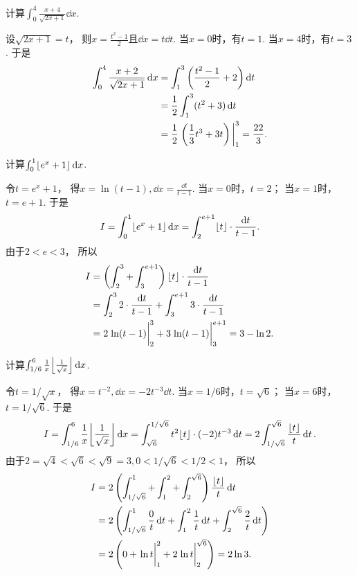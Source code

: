 \begin{example}
计算\(\int_0^4 \frac{x+4}{\sqrt{2x+1}} \dd{x}\).
\begin{solution}
设\(\sqrt{2x+1}=t\)，
则\(x=\frac{t^2-1}2\)且\(\dd{x}=t\dd{t}\).
当\(x=0\)时，有\(t=1\).
当\(x=4\)时，有\(t=3\).
于是\begin{align*}
	\int_0^4 \frac{x+2}{\sqrt{2x+1}} \dd{x}
	&= \int_1^3 \left(\frac{t^2-1}2+2\right) \dd{t} \\
	&= \frac12 \int_1^3 (t^2+3) \dd{t} \\
	&= \frac12 \eval{\left(\frac13 t^3 + 3t\right)}_1^3
	= \frac{22}3.
\end{align*}
\end{solution}
\end{example}

\begin{example}
计算\(\int_0^1 \lfloor e^x+1\rfloor \dd{x}\).
\begin{solution}
令\(t = e^x+1\)，
得\(x = \ln(t-1),
\dd{x} = \frac{\dd{t}}{t-1}\).
当\(x=0\)时，\(t=2\)；
当\(x=1\)时，\(t=e+1\).
于是\[
	I = \int_0^1 \lfloor e^x+1\rfloor \dd{x}
	= \int_2^{e+1} \lfloor t\rfloor \cdot \frac{\dd{t}}{t-1}.
\]
由于\(2<e<3\)，
所以\begin{align*}
	I &= \left( \int_2^3 + \int_3^{e+1} \right) \floor{t} \cdot \frac{\dd{t}}{t-1} \\
	&= \int_2^3 2 \cdot \frac{\dd{t}}{t-1}
	+ \int_3^{e+1} 3 \cdot \frac{\dd{t}}{t-1} \\
	&= 2 \eval{\ln(t-1)}_2^3 + 3 \eval{\ln(t-1)}_3^{e+1}
	= 3 - \ln2.
\end{align*}
\end{solution}
\end{example}
\begin{example}
计算\(\int_{1/6}^6 \frac1x \floor*{\frac1{\sqrt{x}}} \dd{x}\).
\begin{solution}
令\(t = 1/\sqrt{x}\)，
得\(x = t^{-2},
\dd{x} = -2 t^{-3} \dd{t}\).
当\(x=1/6\)时，\(t=\sqrt6\)；
当\(x=6\)时，\(t=1/\sqrt6\).
于是\[
	I = \int_{1/6}^6 \frac1x \floor*{\frac1{\sqrt{x}}} \dd{x}
	= \int_{\sqrt6}^{1/\sqrt6} t^2 \floor{t} \cdot (-2) t^{-3} \dd{t}
	= 2 \int_{1/\sqrt6}^{\sqrt6} \frac{\floor{t}}{t} \dd{t}.
\]
由于\(2 = \sqrt4 < \sqrt6 < \sqrt9 = 3,
0 < 1/\sqrt6 < 1/2 < 1\)，
所以\begin{align*}
	I &= 2 \left( \int_{1/\sqrt6}^1 + \int_1^2 + \int_2^{\sqrt6} \right) \frac{\floor{t}}{t} \dd{t} \\
	&= 2 \left( \int_{1/\sqrt6}^1 \frac0t \dd{t} + \int_1^2 \frac1t \dd{t} + \int_2^{\sqrt6} \frac2t \dd{t} \right) \\
	&= 2 \left( 0 + \eval{\ln t}_1^2 + 2 \eval{\ln t}_2^{\sqrt6} \right)
	= 2 \ln3.
\end{align*}
\end{solution}
\end{example}

